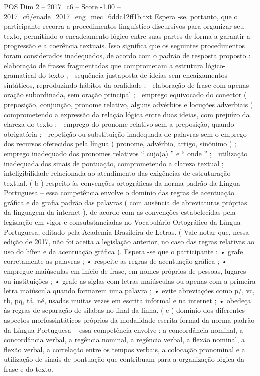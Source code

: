\begin{textsample}{POS Dim 2 – 2017\_c6 – Score -1.00 – 2017\_c6/enade\_2017\_eng\_mec\_6ddc12ff1b.txt}
Espera -se, portanto, que o participante recorra a procedimentos linguístico-discursivos para organizar seu texto, permitindo o encadeamento lógico entre suas partes de forma a garantir a progressão e a coerência textuais.
Isso significa que os seguintes procedimentos foram considerados inadequados, de acordo com o padrão de resposta proposto :  elaboração de frases fragmentadas que comprometam a estrutura lógico-gramatical do texto ;  sequência justaposta de ideias sem encaixamentos sintáticos, reproduzindo hábitos da oralidade ;  elaboração de frase com apenas oração subordinada, sem oração principal ;  emprego equivocado do conector ( preposição, conjunção, pronome relativo, alguns advérbios e locuções adverbiais ) comprometendo a expressão da relação lógica entre duas ideias, com prejuízo da clareza do texto ;  emprego do pronome relativo sem a preposição, quando obrigatória ;  repetição ou substituição inadequada de palavras sem o emprego dos recursos oferecidos pela língua ( pronome, advérbio, artigo, sinônimo ) ;  emprego inadequado dos pronomes relativos “ cujo(a) ” e “ onde ” ;  utilização inadequada dos sinais de pontuação, comprometendo a clareza textual ;  inteligibilidade relacionada ao atendimento das exigências de estruturação textual. ( b ) respeito às convenções ortográficas da norma-padrão da Língua Portuguesa – essa competência envolve o domínio das regras de acentuação gráfica e da grafia padrão das palavras ( com ausência de abreviaturas próprias da linguagem da internet ), de acordo com as convenções estabelecidas pela legislação em vigor e consubstanciadas no Vocabulário Ortográfico da Língua Portuguesa, editado pela Academia Brasileira de Letras. ( Vale notar que, nessa edição de 2017, não foi aceita a legislação anterior, no caso das regras relativas ao uso do hífen e da acentuação gráfica ).
Espera -se que o participante : • grafe corretamente as palavras ; • respeite as regras de acentuação gráfica ; • empregue maiúsculas em início de frase, em nomes próprios de pessoas, lugares ou instituições ; • grafe as siglas com letras maiúsculas ou apenas com a primeira letra maiúscula quando formarem uma palavra ; • evite abreviações como p/, vc, tb, pq, tá, né, usadas muitas vezes em escrita informal e na internet ; • obedeça às regras de separação de sílabas no final da linha. ( c ) domínio dos diferentes aspectos morfossintáticos próprios da modalidade escrita formal da norma-padrão da Língua Portuguesa – essa competência envolve : a concordância nominal, a concordância verbal, a regência nominal, a regência verbal, a flexão nominal, a flexão verbal, a correlação entre os tempos verbais, a colocação pronominal e a utilização de sinais de pontuação que contribuam para a organização lógica da frase e do texto.

\end{textsample}
